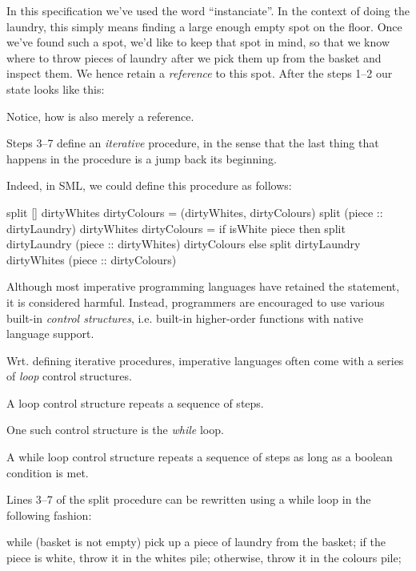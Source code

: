 In this specification we've used the word ``instanciate''. In the context of
doing the laundry, this simply means finding a large enough empty spot on the
floor. Once we've found such a spot, we'd like to keep that spot in mind, so
that we know where to throw pieces of laundry after we pick them up from the
basket and inspect them. We hence retain a \emph{reference} to this spot.
After the steps 1--2 our state looks like this:

\begin{codebox}
\end{codebox}

Notice, how  is also merely a reference.

Steps 3--7 define an \emph{iterative} procedure, in the sense that the last
thing that happens in the procedure is a jump back its beginning.

Indeed, in SML, we could define this procedure as follows:

\begin{code}
split [] dirtyWhites dirtyColours =
  (dirtyWhites, dirtyColours)
split (piece :: dirtyLaundry) dirtyWhites dirtyColours =
  if isWhite piece
  then
    split dirtyLaundry (piece :: dirtyWhites) dirtyColours
  else
    split dirtyLaundry dirtyWhites (piece :: dirtyColours)
\end{code}

Although most imperative programming languages have retained the 
statement, it is considered harmful. Instead, programmers are encouraged to use
various built-in \emph{control structures}, i.e. built-in higher-order
functions with native language support.

Wrt. defining iterative procedures, imperative languages often come with a
series of \emph{loop} control structures.

\begin{definition}

A loop control structure repeats a sequence of steps.

\end{definition}

One such control structure is the \emph{while} loop.

\begin{definition}

A while loop control structure repeats a sequence of steps as long as a boolean
condition is met.

\end{definition}

Lines 3--7 of the split procedure can be rewritten using a while loop in the
following fashion:

\begin{code}
while (basket is not empty)
{
  pick up a piece of laundry from the basket;
  if the piece is white, throw it in the whites pile;
  otherwise, throw it in the colours pile;
}
\end{code}
